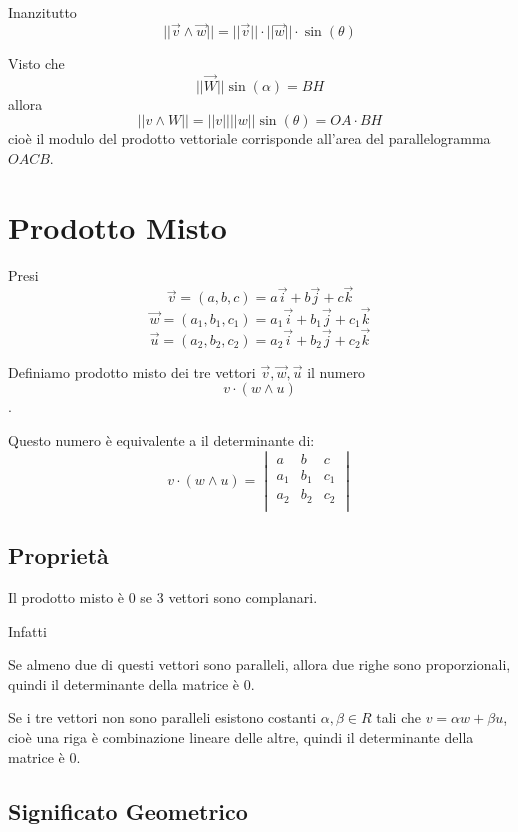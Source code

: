 Inanzitutto
$$ ||\vec{v} \wedge \vec{w}|| = ||\vec{v}||\cdot ||\vec{w}|| \cdot \sin(\theta) $$

Visto che
$$||\vec{W}||\sin(\alpha) = BH$$ allora $$||v \wedge W|| = ||v||||w||\sin(\theta) = OA \cdot BH$$ cioè il modulo del prodotto vettoriale corrisponde all'area del parallelogramma $OACB$.

\section{Prodotto Misto}

\begin{definition}
Presi
$$\vec{v} = (a,b,c) = a\vec{i}+b\vec{j}+c\vec{k}$$
$$\vec{w} = (a_1,b_1,c_1) = a_1\vec{i}+b_1\vec{j}+c_1\vec{k}$$
$$\vec{u} = (a_2,b_2,c_2) = a_2\vec{i}+b_2\vec{j}+c_2\vec{k}$$

Definiamo prodotto misto dei tre vettori $\vec{v}, \vec{w},\vec{u}$ il numero
$$v \cdot (w \wedge u)$$.
\end{definition}

Questo numero è equivalente a il determinante di:
$$
v \cdot (w \wedge u) =
\begin{vmatrix}
    a       & b       & c       \\
    a_1     & b_1     & c_1     \\
    a_2     & b_2     & c_2     \\
\end{vmatrix}
$$

\subsection{Proprietà}
\begin{property}
Il prodotto misto è 0 se 3 vettori sono complanari.
\end{property}

Infatti
\begin{property}
Se almeno due di questi vettori sono paralleli, allora due righe sono proporzionali, quindi il determinante della matrice è 0.
\end{property}

\begin{property}
Se i tre vettori non sono paralleli esistono costanti $\alpha, \beta \in R$ tali che $v = \alpha w + \beta u$, cioè una riga è combinazione lineare delle altre, quindi il determinante della matrice è 0.
\end{property}

\subsection{Significato Geometrico}

